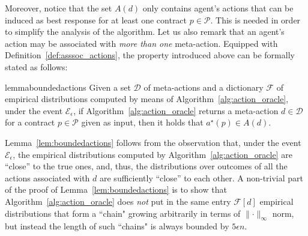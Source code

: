 %
Moreover, notice that the set $A(d)$ only contains agent's actions that can be induced as best response for at least one contract $p \in \mathcal{P}$.
%
This is needed in order to simplify the analysis of the algorithm.
%
Let us also remark that an agent's action may be associated with \emph{more than one} meta-action.
%
%
Equipped with Definition~\ref{def:asssoc_actions}, the property introduced above can be formally stated as follows:
%
\begin{restatable}{lemma}{boundedactions}\label{lem:boundedactions}
	Given a set $\mathcal{D}$ of meta-actions and a dictionary $\mathcal{F}$ of empirical distributions computed by means of Algorithm~\ref{alg:action_oracle}, under the event $\mathcal{E}_\epsilon$, if Algorithm~\ref{alg:action_oracle} returns a meta-action $d \in \mathcal{D}$ for a contract $p \in \mathcal{P}$ given as input, then it holds that $a^\star(p)\in A(d)$.
\end{restatable}
%
Lemma~\ref{lem:boundedactions} follows from the observation that, under the event $\mathcal{E}_\epsilon$, the empirical distributions computed by Algorithm~\ref{alg:action_oracle} are ``close'' to the true ones, and, thus, the distributions over outcomes of all the actions associated with $d$ are sufficiently ``close'' to each other.
%
A non-trivial part of the proof of Lemma~\ref{lem:boundedactions} is to show that Algorithm~\ref{alg:action_oracle} does \emph{not} put in the same entry $\mathcal{F}[d]$ empirical distributions that form a ``chain" growing arbitrarily in terms of $\lVert \cdot \rVert_\infty$ norm, but instead the length of such ``chains" is always bounded by $5 \epsilon n$.  
%
%
